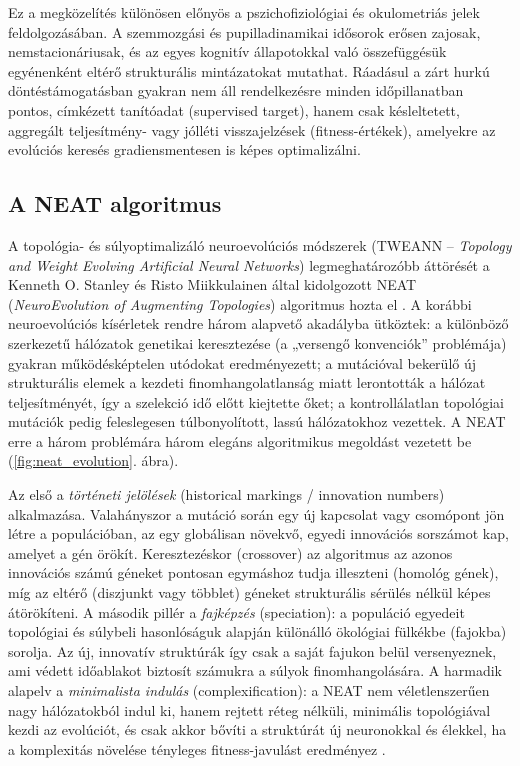 \documentclass[12pt,a4paper,oneside]{book}
\begin{document}
Ez a megközelítés különösen előnyös a pszichofiziológiai és okulometriás jelek feldolgozásában. A szemmozgási és pupilladinamikai idősorok erősen zajosak, nemstacionáriusak, és az egyes kognitív állapotokkal való összefüggésük egyénenként eltérő strukturális mintázatokat mutathat. Ráadásul a zárt hurkú döntéstámogatásban gyakran nem áll rendelkezésre minden időpillanatban pontos, címkézett tanítóadat (supervised target), hanem csak késleltetett, aggregált teljesítmény- vagy jólléti visszajelzések (fitness-értékek), amelyekre az evolúciós keresés gradiensmentesen is képes optimalizálni.

\subsection{A NEAT algoritmus}

A topológia- és súlyoptimalizáló neuroevolúciós módszerek (TWEANN -- \emph{Topology and Weight Evolving Artificial Neural Networks}) legmeghatározóbb áttörését a Kenneth O. Stanley és Risto Miikkulainen által kidolgozott NEAT (\emph{NeuroEvolution of Augmenting Topologies}) algoritmus hozta el \cite{stanley2002}. A korábbi neuroevolúciós kísérletek rendre három alapvető akadályba ütköztek: a különböző szerkezetű hálózatok genetikai keresztezése (a „versengő konvenciók” problémája) gyakran működésképtelen utódokat eredményezett; a mutációval bekerülő új strukturális elemek a kezdeti finomhangolatlanság miatt lerontották a hálózat teljesítményét, így a szelekció idő előtt kiejtette őket; a kontrollálatlan topológiai mutációk pedig feleslegesen túlbonyolított, lassú hálózatokhoz vezettek. A NEAT erre a három problémára három elegáns algoritmikus megoldást vezetett be (\ref{fig:neat_evolution}. ábra).

Az első a \emph{történeti jelölések} (historical markings / innovation numbers) alkalmazása. Valahányszor a mutáció során egy új kapcsolat vagy csomópont jön létre a populációban, az egy globálisan növekvő, egyedi innovációs sorszámot kap, amelyet a gén örökít. Keresztezéskor (crossover) az algoritmus az azonos innovációs számú géneket pontosan egymáshoz tudja illeszteni (homológ gének), míg az eltérő (diszjunkt vagy többlet) géneket strukturális sérülés nélkül képes átörökíteni. A második pillér a \emph{fajképzés} (speciation): a populáció egyedeit topológiai és súlybeli hasonlóságuk alapján különálló ökológiai fülkékbe (fajokba) sorolja. Az új, innovatív struktúrák így csak a saját fajukon belül versenyeznek, ami védett időablakot biztosít számukra a súlyok finomhangolására. A harmadik alapelv a \emph{minimalista indulás} (complexification): a NEAT nem véletlenszerűen nagy hálózatokból indul ki, hanem rejtett réteg nélküli, minimális topológiával kezdi az evolúciót, és csak akkor bővíti a struktúrát új neuronokkal és élekkel, ha a komplexitás növelése tényleges fitness-javulást eredményez \cite{stanley2002}.
\end{document}
